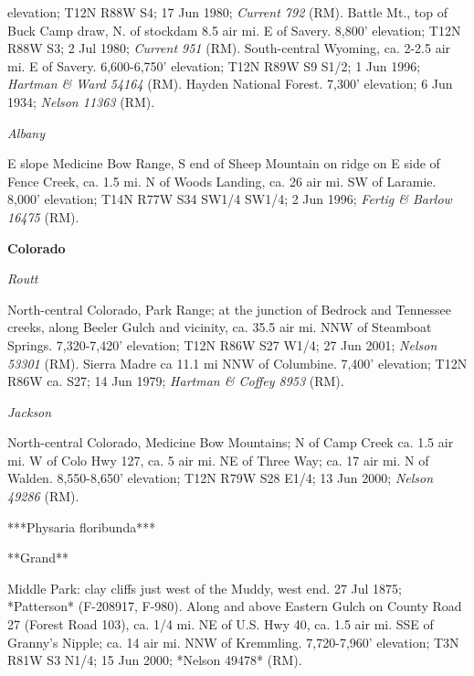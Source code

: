 elevation; T12N R88W S4; 17 Jun 1980; \textit{Current 792} (RM).  Battle Mt., top of Buck Camp draw, N. of stockdam 8.5 air mi. E of Savery.  8,800’ elevation; T12N R88W S3; 2 Jul 1980; \textit{Current 951} (RM).  South-central Wyoming, ca. 2-2.5 air mi. E of Savery.  6,600-6,750’ elevation; T12N R89W S9 S1/2; 1 Jun 1996; \textit{Hartman \& Ward 54164} (RM).  Hayden National Forest.  7,300' elevation; 6 Jun 1934; \textit{Nelson 11363} (RM).  

\textit{Albany}

E slope Medicine Bow Range, S end of Sheep Mountain on ridge on E side of Fence Creek, ca. 1.5 mi. N of Woods Landing, ca. 26 air mi. SW of Laramie.  8,000' elevation; T14N R77W S34 SW1/4 SW1/4; 2 Jun 1996; \textit{Fertig \& Barlow 16475} (RM).

\textbf{Colorado}

\textit{Routt}

North-central Colorado, Park Range; at the junction of Bedrock and Tennessee creeks, along Beeler Gulch and vicinity, ca. 35.5 air mi. NNW of Steamboat Springs.  7,320-7,420' elevation; T12N R86W S27 W1/4; 27 Jun 2001; \textit{Nelson 53301} (RM).  Sierra Madre ca 11.1 mi NNW of Columbine.  7,400' elevation; T12N R86W ca. S27; 14 Jun 1979; \textit{Hartman \& Coffey 8953} (RM). 

\textit{Jackson}

North-central Colorado, Medicine Bow Mountains; N of Camp Creek ca. 1.5 air mi. W of Colo Hwy 127, ca. 5 air mi. NE of Three Way; ca. 17 air mi. N of Walden.  8,550-8,650' elevation; T12N R79W S28 E1/4; 13 Jun 2000; \textit{Nelson 49286} (RM).

***Physaria floribunda***

**Grand**

Middle Park: clay cliffs just west of the Muddy, west end. 27 Jul 1875; *Patterson* (F-208917, F-980).  Along and above Eastern Gulch on County Road 27 (Forest Road 103), ca. 1/4 mi. NE of U.S. Hwy 40, ca. 1.5 air mi. SSE of Granny's Nipple; ca. 14 air mi. NNW of Kremmling.  7,720-7,960' elevation; T3N R81W S3 N1/4; 15 Jun 2000; *Nelson 49478* (RM).  


